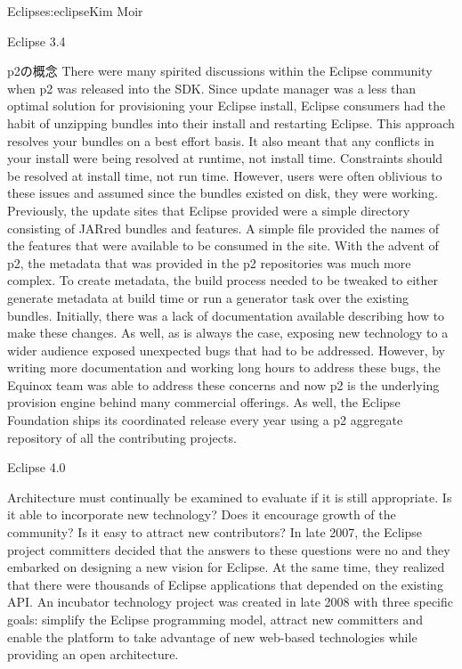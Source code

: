 \begin{aosachapter}{Eclipse}{s:eclipse}{Kim Moir}
\begin{aosasect1}{Eclipse 3.4}
\begin{aosasect2}{p2の概念}
There were many spirited discussions within the Eclipse community when p2
was released into the SDK\@. Since update manager was a less than
optimal solution for provisioning your Eclipse install, Eclipse
consumers had the habit of unzipping bundles into their install and
restarting Eclipse. This approach resolves your bundles on a best
effort basis. It also meant that any conflicts in your install were
being resolved at runtime, not install time.  Constraints should be
resolved at install time, not run time. However, users were often
oblivious to these issues and assumed since the bundles existed on
disk, they were working.  Previously, the update sites that Eclipse
provided were a simple directory consisting of JARred bundles and
features.  A simple  file provided the names of the
features that were available to be consumed in the site.  With the
advent of p2, the metadata that was provided in the p2 repositories
was much more complex. To create metadata, the build process needed to
be tweaked to either generate metadata at build time or run a
generator task over the existing bundles. Initially, there was a lack
of documentation available describing how to make these changes.  As
well, as is always the case, exposing new technology to a wider
audience exposed unexpected bugs that had to be addressed. However, by
writing more documentation and working long hours to address these
bugs, the Equinox team was able to address these concerns and now p2
is the underlying provision engine behind many commercial
offerings. As well, the Eclipse Foundation ships its coordinated
release every year using a p2 aggregate repository of all the
contributing projects.

\end{aosasect2}

\end{aosasect1}

\begin{aosasect1}{Eclipse 4.0}

Architecture must continually be examined to evaluate if it is still
appropriate. Is it able to incorporate new technology? Does it
encourage growth of the community?  Is it easy to attract new
contributors?  In late 2007, the Eclipse project committers decided
that the answers to these questions were no and they embarked on
designing a new vision for Eclipse. At the same time, they realized
that there were thousands of Eclipse applications that depended on the
existing API\@.  An incubator technology project was created in late
2008 with three specific goals: simplify the Eclipse programming
model, attract new committers and enable the platform to take
advantage of new web-based technologies while providing an open
architecture.


\end{aosasect1}
\end{aosachapter}
